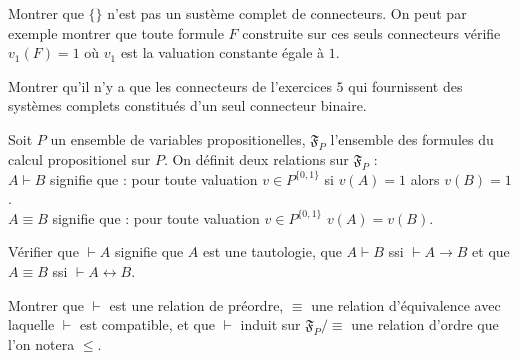 \documentclass[french]{report}
\begin{document}
\begin{exo}
    Montrer que \(\{\}\) n'est pas un sustème complet de connecteurs. On peut
    par exemple montrer que toute formule \(F\) construite sur ces seuls connecteurs
    vérifie \(v_1(F)=1\) où \(v_1\) est la valuation constante égale à \(1\).
\end{exo}

\begin{exo}
    Montrer qu'il n'y a que les connecteurs de l'exercices \(5\) qui fournissent
    des systèmes complets constitués d'un seul connecteur binaire.
\end{exo}

\begin{exo}
    Soit \(P\) un ensemble de variables propositionelles, \(\mathfrak{F}_P\) l'ensemble
    des formules du calcul propositionel sur \(P\). On définit deux relations sur
    \(\mathfrak{F}_P\) :\smallskip\\
    \(A\vdash B\) signifie que : pour toute valuation \(v\in P^{\{0,1\}}\) si
    \(v(A)=1\) alors \(v(B)=1\).\\
    \(A\equiv B\) signifie que : pour toute valuation \(v\in P^{\{0,1\}}\) \(v(A)=v(B)\).
    \begin{q}{1}
        Vérifier que \(\vdash A\) signifie que \(A\) est une tautologie, que \(A\vdash B\)
        ssi \(\vdash A\rightarrow B\) et que \(A\equiv B\) ssi \(\vdash A\leftrightarrow B\).
    \end{q}
    \begin{q}{2}
        Montrer que \(\vdash\) est une relation de préordre, \(\equiv\) une relation
        d'équivalence avec laquelle \(\vdash\) est compatible, et que \(\vdash\)
        induit sur \(\mathfrak{F}_P/\equiv\) une relation d'ordre que l'on notera \(\leq\).
    \end{q}
\end{exo}
\end{document}
